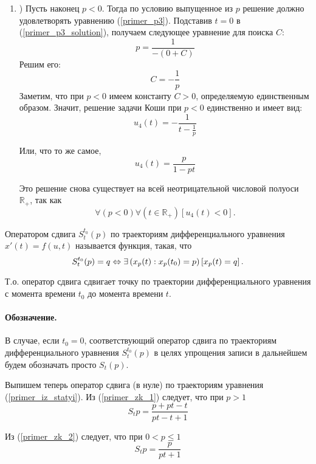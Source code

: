 \begin{enumerate}
\item)
Пусть наконец $p<0$.
Тогда по условию выпущенное из $p$ решение должно удовлетворять уравнению (\ref{primer_p3}).
Подставив $t=0$ в (\ref{primer_p3_solution}), получаем следующее уравнение для поиска $C$:
$$
	p=\frac{1}{-(0+C)}
$$
Решим его:
$$
	C=-\frac{1}{p}
$$
Заметим, что при $p<0$ имеем константу $C>0$, определяемую единственным образом.
Значит, решение задачи Коши при $p<0$ единственно и имеет вид:
\begin{equation}\label{primer_zk_4_0}
	u_4(t)=-\frac{1}{t-\frac{1}{p}}
\end{equation}

Или, что то же самое,
\begin{equation}\label{primer_zk_4}
	u_4(t)=\frac{p}{1-pt}
\end{equation}

Это решение снова существует на всей неотрицательной числовой полуоси $\mathbb{R}_+$, так как
$$
	\forall(p<0)\forall\left(t \in \mathbb{R}_+\right)\left[u_4(t) < 0\right].
$$





\end{enumerate}

\opred
Оператором сдвига $S^{t_0}_t (p)$ по траекториям дифференциального уравнения $x'(t) = f(u,t)$ называется функция, такая, что
\begin{equation*}
	S^{t_0}_t (p) = q \Leftrightarrow
		\exists\left(x_p(t) : x_p(t_0) = p\right)\left[x_p(t) = q\right].
\end{equation*}

Т.о. оператор сдвига сдвигает точку по траектории дифференциального уравнения с момента времени $t_0$ до момента времени $t$.

\paragraph{Обозначение.}
В случае, если $t_0=0$, соответствующий оператор сдвига по траекториям дифференциального уравнения $S^{t_0}_t (p)$ в целях упрощения записи  в дальнейшем будем обозначать просто $S_t (p)$.

Выпишем теперь оператор сдвига (в нуле) по траекториям уравнения (\ref{primer_iz_statyi}).
Из (\ref{primer_zk_1}) следует, что при $p>1$
\begin{equation}\label{sdvig_p1}
	S_t p =\frac{p+pt-t}{pt-t+1}
\end{equation}

Из (\ref{primer_zk_2}) следует, что при $0 < p \leq 1$
\begin{equation}\label{sdvig_p2}
	S_t p =\frac{p}{pt+1}
\end{equation}

